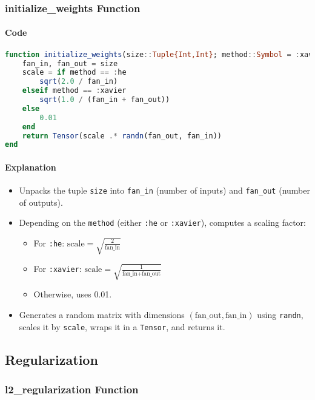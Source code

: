 \documentclass[11pt]{article}
\begin{document}
\subsubsection{initialize\_weights Function}
\paragraph{Code}
\begin{lstlisting}[language=Julia]
function initialize_weights(size::Tuple{Int,Int}; method::Symbol = :xavier)::Tensor
    fan_in, fan_out = size
    scale = if method == :he
        sqrt(2.0 / fan_in)
    elseif method == :xavier
        sqrt(1.0 / (fan_in + fan_out))
    else
        0.01
    end
    return Tensor(scale .* randn(fan_out, fan_in))
end
\end{lstlisting}

\paragraph{Explanation}
\begin{itemize}
    \item Unpacks the tuple \texttt{size} into \texttt{fan\_in} (number of inputs) and \texttt{fan\_out} (number of outputs).
    \item Depending on the \texttt{method} (either \texttt{:he} or \texttt{:xavier}), computes a scaling factor:
    \begin{itemize}
        \item For \texttt{:he}: \( \text{scale} = \sqrt{\frac{2}{\text{fan\_in}}} \)
        \item For \texttt{:xavier}: \( \text{scale} = \sqrt{\frac{1}{\text{fan\_in} + \text{fan\_out}}} \)
        \item Otherwise, uses 0.01.
    \end{itemize}
    \item Generates a random matrix with dimensions \((\text{fan\_out}, \text{fan\_in})\) using \texttt{randn}, scales it by \texttt{scale}, wraps it in a \texttt{Tensor}, and returns it.
\end{itemize}

\subsection{Regularization}
\subsubsection{l2\_regularization Function}
\end{document}

